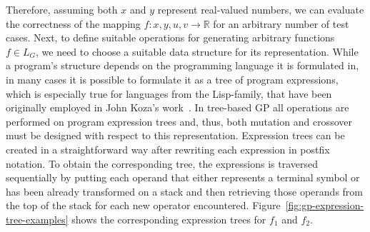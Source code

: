 Therefore, assuming both $x$ and $y$ represent real-valued numbers, we can evaluate the correctness of the mapping $f : x, y, u, v \to \mathbb{R}$ for an arbitrary number of test cases.
Next, to define suitable operations for generating arbitrary functions $f \in L_G$, we need to choose a suitable data structure for its representation.
While a program's structure depends on the programming language it is formulated in, in many cases it is possible to formulate it as a tree of program expressions, which is especially true for languages from the Lisp-family, that have been originally employed in John Koza's work~\cite{koza1994genetic}.
In tree-based GP all operations are performed on program expression trees and, thus, both mutation and crossover must be designed with respect to this representation.
Expression trees can be created in a straightforward way after rewriting each expression in postfix notation. 
To obtain the corresponding tree, the expressions is traversed sequentially by putting each operand that either represents a terminal symbol or has been already transformed on a stack and then retrieving those operands from the top of the stack for each new operator encountered.
Figure~\ref{fig:gp-expression-tree-examples} shows the corresponding expression trees for $f_1$ and $f_2$.
